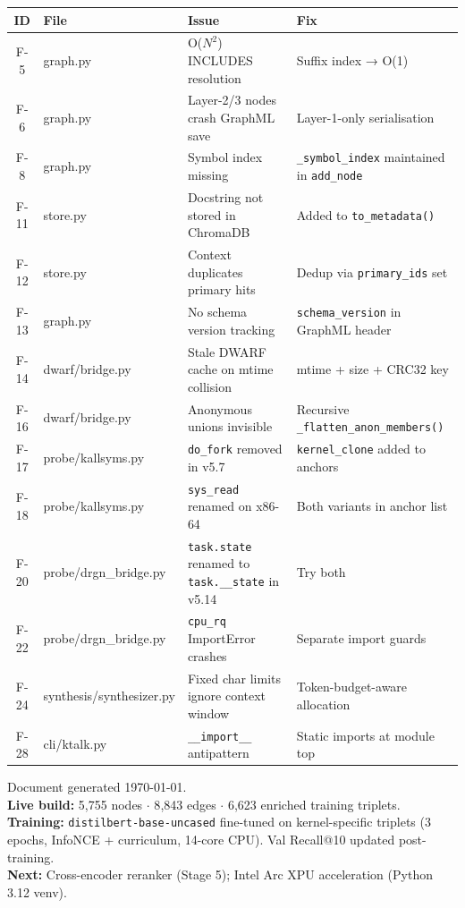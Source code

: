 \documentclass[11pt,a4paper]{article}
\begin{document}
\begin{center}
\begin{tabular}{@{}clll@{}}
\toprule
\textbf{ID} & \textbf{File} & \textbf{Issue} & \textbf{Fix} \\
\midrule
F-5  & graph.py    & O($N^2$) INCLUDES resolution & Suffix index → O(1) \\
F-6  & graph.py    & Layer-2/3 nodes crash GraphML save & Layer-1-only serialisation \\
F-8  & graph.py    & Symbol index missing & \texttt{\_symbol\_index} maintained in \texttt{add\_node} \\
F-11 & store.py    & Docstring not stored in ChromaDB & Added to \texttt{to\_metadata()} \\
F-12 & store.py    & Context duplicates primary hits & Dedup via \texttt{primary\_ids} set \\
F-13 & graph.py    & No schema version tracking & \texttt{schema\_version} in GraphML header \\
F-14 & dwarf/bridge.py & Stale DWARF cache on mtime collision & mtime + size + CRC32 key \\
F-16 & dwarf/bridge.py & Anonymous unions invisible & Recursive \texttt{\_flatten\_anon\_members()} \\
F-17 & probe/kallsyms.py & \texttt{do\_fork} removed in v5.7 & \texttt{kernel\_clone} added to anchors \\
F-18 & probe/kallsyms.py & \texttt{sys\_read} renamed on x86-64 & Both variants in anchor list \\
F-20 & probe/drgn\_bridge.py & \texttt{task.state} renamed to \texttt{task.\_\_state} in v5.14 & Try both \\
F-22 & probe/drgn\_bridge.py & \texttt{cpu\_rq} ImportError crashes & Separate import guards \\
F-24 & synthesis/synthesizer.py & Fixed char limits ignore context window & Token-budget-aware allocation \\
F-28 & cli/ktalk.py & \texttt{\_\_import\_\_} antipattern & Static imports at module top \\
\bottomrule
\end{tabular}
\end{center}

\vfill

\begin{tcolorbox}[
  colback=codebg, colframe=darkgrey!30,
  arc=4pt, boxrule=0.6pt
]
\small\centering
Document generated \today.\\[2pt]
\textbf{Live build:} 5{,}755 nodes $\cdot$ 8{,}843 edges $\cdot$ 6{,}623 enriched training triplets.\\
\textbf{Training:} \texttt{distilbert-base-uncased} fine-tuned on kernel-specific triplets
(3 epochs, InfoNCE + curriculum, 14-core CPU). Val Recall@10 updated post-training.\\
\textbf{Next:} Cross-encoder reranker (Stage 5); Intel Arc XPU acceleration (Python 3.12 venv).
\end{tcolorbox}
\end{document}
